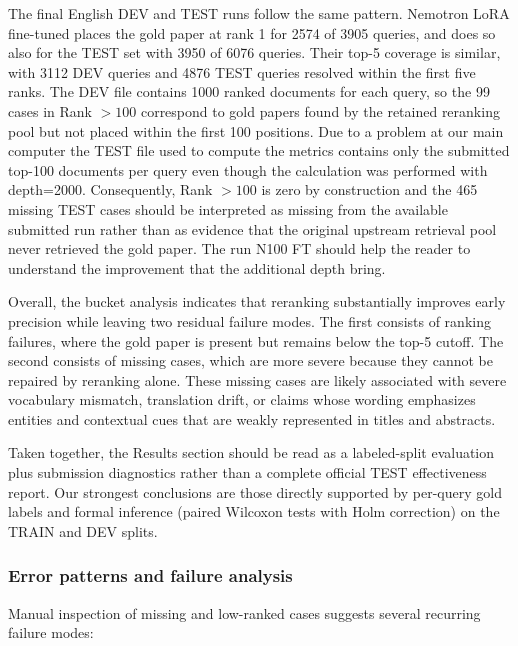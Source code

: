 The final English DEV and TEST runs follow the same pattern. Nemotron LoRA fine-tuned places the gold paper at rank 1 for 2574 of 3905 queries, and does so also for the TEST set with 3950 of 6076 queries. Their top-5 coverage is similar, with 3112 DEV queries and 4876 TEST queries resolved within the first five ranks. The DEV file contains 1000 ranked documents for each query, so the 99 cases in Rank $>100$ correspond to gold papers found by the retained reranking pool but not placed within the first 100 positions. Due to a problem at our main computer the TEST file used to compute the metrics contains only the submitted top-100 documents per query even though the calculation was performed with depth=2000. Consequently, Rank $>100$ is zero by construction and the 465 missing TEST cases should be interpreted as missing from the available submitted run rather than as evidence that the original upstream retrieval pool never retrieved the gold paper. The run N100 FT should help the reader to understand the improvement that the additional depth bring.


Overall, the bucket analysis indicates that reranking substantially improves early precision while leaving two residual failure modes. The first consists of ranking failures, where the gold paper is present but remains below the top-5 cutoff. The second consists of missing cases, which are more severe because they cannot be repaired by reranking alone. These missing cases are likely associated with severe vocabulary mismatch, translation drift, or claims whose wording emphasizes entities and contextual cues that are weakly represented in titles and abstracts.

Taken together, the Results section should be read as a labeled-split evaluation plus submission diagnostics rather than a complete official TEST effectiveness report. Our strongest conclusions are those directly supported by per-query gold labels and formal inference (paired Wilcoxon tests with Holm correction) on the TRAIN and DEV splits. 


\subsubsection{Error patterns and failure analysis}

Manual inspection of missing and low-ranked cases suggests several recurring failure modes:

